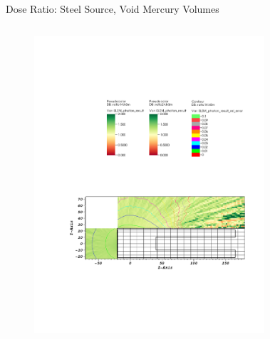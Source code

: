\documentclass{beamer}
\begin{document}
\begin{frame}{Dose Ratio: Steel Source, Void Mercury Volumes}
\begin{columns}[T]
        \begin{figure}
                \includegraphics[scale=0.49,trim={6.75cm 16.5cm 11cm 6cm},clip]{figs/ratio_steel_void.pdf}
        \end{figure}
        \begin{figure}

\end{figure}
\end{columns}
\end{frame}
\end{document}
